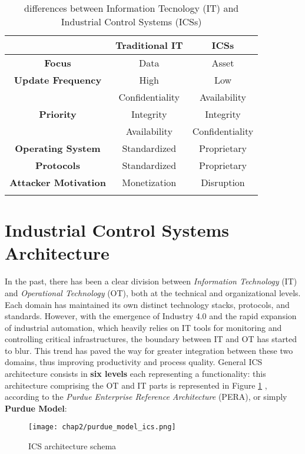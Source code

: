 \bigskip
\begin{longtable}[c]{| c | c | c |}
	\hline
	& \textbf{Traditional IT} & \textbf{ICSs} \\ [0.5ex] 
	\hline
	\textbf{Focus} & Data & Asset \\
	\hline
	\textbf{Update Frequency} & High & Low \\
	\hline 
	\multirow{3}{4em}{\textbf{Priority}} & Confidentiality & Availability \\
	& Integrity & Integrity \\
	& Availability & Confidentiality \\
	\hline
	\textbf{Operating System} & Standardized & Proprietary \\
	\hline
	\textbf{Protocols} & Standardized & Proprietary \\
	\hline
	\textbf{Attacker Motivation} & Monetization & Disruption \\
	\hline
	
	\caption{differences between Information Tecnology (IT) and Industrial Control Systems (ICSs)}
	\label{table:1_it_ot_difference}
\end{longtable}
\vfill

\section{Industrial Control Systems Architecture}
\label{sec:ics_components}
In the past, there has been a clear division between \textit{Information Technology} (IT) and \textit{Operational Technology} (OT), both at the technical and organizational levels. Each domain has maintained its own distinct technology stacks, protocols, and standards. However, with the emergence of Industry 4.0 and the rapid expansion of industrial automation, which heavily relies on IT tools for monitoring and controlling critical infrastructures, the boundary between IT and OT has started to blur. This trend has paved the way for greater integration between these two domains, thus improving productivity and process quality.\newline \newline
General ICS architecture consists in \textbf{six levels} each representing a functionality: this architecture comprising the OT and IT parts is represented in Figure \ref{fig:SCADA_schema} \cite{purdue_model}\cite{tesi_phd_norvegese}, according to the \textit{Purdue Enterprise Reference Architecture} (PERA), or simply \textbf{Purdue Model}:

\begin{figure}[ht]
	\centering
	\texttt{[image: chap2/purdue\_model\_ics.png]}
	\caption{ICS architecture schema}
	\label{fig:SCADA_schema}
\end{figure}

